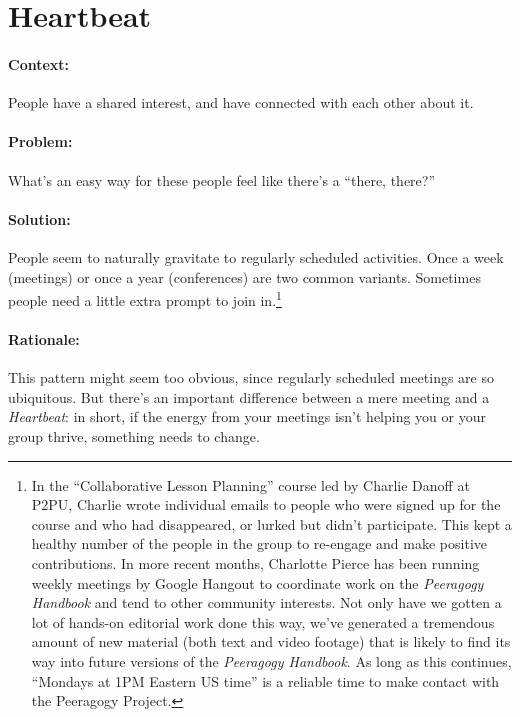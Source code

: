 \section{Heartbeat}

\paragraph{Context:}
People have a shared interest, and have connected with each other about it.

\paragraph{Problem:} What's an easy way for these people feel like there's a ``there, there?''

\paragraph{Solution:} People seem to naturally gravitate to regularly scheduled
activities. Once a week (meetings) or once a year (conferences) are two common variants.  Sometimes people need a little extra prompt to join in.\footnote{In the ``Collaborative Lesson Planning'' course led
by Charlie Danoff at P2PU, Charlie wrote individual emails to people who
were signed up for the course and who had disappeared, or lurked but
didn't participate. This kept a healthy number of the people in the
group to re-engage and make positive contributions. In more recent
months, Charlotte Pierce has been running weekly meetings by Google
Hangout to coordinate work on the \emph{Peeragogy Handbook} and tend to other community interests. Not only have we
gotten a lot of hands-on editorial work done this way, we've generated a
tremendous amount of new material (both text and video footage) that is
likely to find its way into future versions of the \emph{Peeragogy Handbook}.  As long as this continues, ``Mondays at 1PM Eastern US time'' is a reliable time to make contact with the Peeragogy Project.}

\paragraph{Rationale:}  This pattern might seem too obvious, since regularly scheduled meetings are so ubiquitous.  But there's an important difference between a mere meeting and a \emph{Heartbeat}: in short, if the energy from your meetings isn't helping you or your group thrive, something needs to change.

